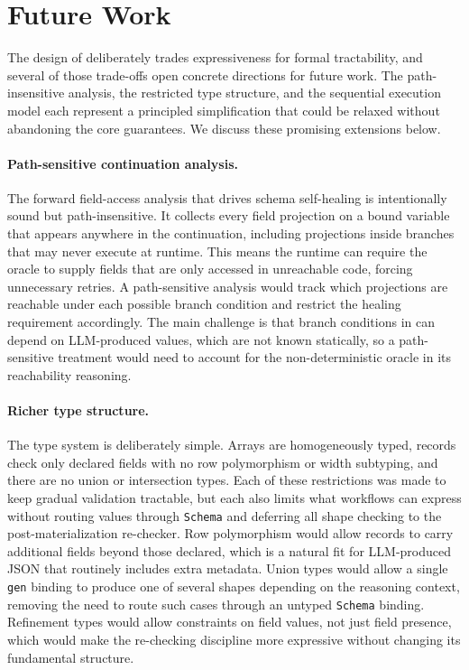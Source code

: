 \section{Future Work}
\label{sec:future}

The design of \pact{} deliberately trades expressiveness for formal 
tractability, and several of those trade-offs open concrete directions 
for future work. The path-insensitive analysis, the restricted type 
structure, and the sequential execution model each represent a 
principled simplification that could be relaxed without abandoning 
the core guarantees. We discuss these promising extensions below.

\paragraph{Path-sensitive continuation analysis.}
The forward field-access analysis that drives schema self-healing 
is intentionally sound but path-insensitive. It collects every 
field projection on a bound variable that appears anywhere in the 
continuation, including projections inside branches that may never 
execute at runtime. This means the runtime can require the oracle 
to supply fields that are only accessed in unreachable code, 
forcing unnecessary retries. A path-sensitive analysis would track 
which projections are reachable under each possible branch 
condition and restrict the healing requirement accordingly. The 
main challenge is that branch conditions in \pact{} can depend on 
LLM-produced values, which are not known statically, so a 
path-sensitive treatment would need to account for the 
non-deterministic oracle in its reachability reasoning.

\paragraph{Richer type structure.}
The \pact{} type system is deliberately simple. Arrays are 
homogeneously typed, records check only declared fields with no 
row polymorphism or width subtyping, and there are no union or 
intersection types. Each of these restrictions was made to keep 
gradual validation tractable, but each also limits what workflows 
can express without routing values through \texttt{Schema} and 
deferring all shape checking to the post-materialization 
re-checker. Row polymorphism would allow records to carry 
additional fields beyond those declared, which is a natural fit 
for LLM-produced JSON that routinely includes extra metadata. 
Union types would allow a single \texttt{gen} binding to produce 
one of several shapes depending on the reasoning context, removing 
the need to route such cases through an untyped \texttt{Schema} 
binding. Refinement types would allow constraints on field values, 
not just field presence, which would make the re-checking 
discipline more expressive without changing its fundamental 
structure.

